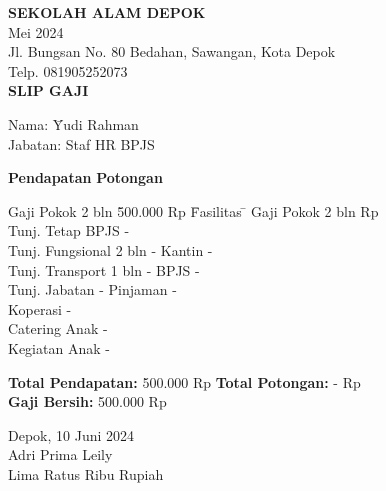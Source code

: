 \documentclass{article}
\begin{document}
\begin{center}
    \textbf{SEKOLAH ALAM DEPOK}\\
    Mei 2024\\
    Jl. Bungsan No. 80 Bedahan, Sawangan, Kota Depok\\
    Telp. 081905252073\\[1em]
    \textbf{SLIP GAJI}
\end{center}

\vspace{1em}

\begin{tabbing}
    Nama: \= Yudi Rahman \\
    Jabatan: \> Staf HR BPJS
\end{tabbing}

\vspace{1em}

\noindent\textbf{Pendapatan} \hfill \textbf{Potongan} \\[0.5em]
\begin{tabbing}
    Gaji Pokok 2 bln \hspace{4cm} \= 500.000 Rp \hspace{4cm} \= Fasilitas \= \kill
    Gaji Pokok 2 bln  Rp \\
    Tunj. Tetap BPJS \> - \\
    Tunj. Fungsional 2 bln \> - \> Kantin \> - \\
    Tunj. Transport 1 bln \> - \> BPJS \> - \\
    Tunj. Jabatan \> - \> Pinjaman \> - \\
    \> \> Koperasi \> - \\
    \> \> Catering Anak \> - \\
    \> \> Kegiatan Anak \> - \\
\end{tabbing}

\vspace{1em}

\noindent \textbf{Total Pendapatan:} 500.000 Rp \hfill \textbf{Total Potongan:} - Rp \\[1em]
\textbf{Gaji Bersih:} 500.000 Rp \\

\vfill

\begin{flushright}
    Depok, 10 Juni 2024 \\[2em]
    Adri Prima Leily \\
    Lima Ratus Ribu Rupiah
\end{flushright}
\end{document}
